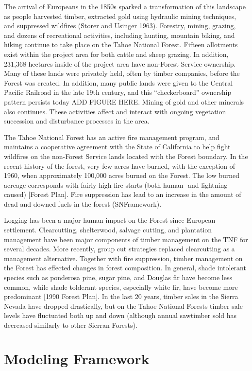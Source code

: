 The arrival of Europeans in the 1850s sparked a transformation of this landscape as people harvested timber, extracted gold using hydraulic mining techniques, and suppressed wildfires (Storer and Usinger 1963). Forestry, mining, grazing, and dozens of recreational activities, including hunting, mountain biking, and hiking continue to take place on the Tahoe National Forest. Fifteen allotments exist within the project area for both cattle and sheep grazing. In addition, 231,368 hectares inside of the project area have non-Forest Service ownership. Many of these lands were privately held, often by timber companies, before the Forest was created. In addition, many public lands were given to the Central Pacific Railroad in the late 19th century, and this ``checkerboard'' ownership pattern persists today ADD FIGURE HERE. Mining of gold and other minerals also continues. These activities affect and interact with ongoing vegetation succession and disturbance processes in the area.

The Tahoe National Forest has an active fire management program, and maintains a cooperative agreement with the State of California to help fight wildfires on the non-Forest Service lands located with the Forest boundary. In the recent history of the forest, very few acres have burned, with the exception of 1960, when approximately 100,000 acres burned on the Forest. The low burned acreage corresponds with fairly high fire starts (both human- and lightning-caused) [Forest Plan]. Fire suppression has lead to an increase in the amount of dead and downed fuels in the forest (SNFramework).

Logging has been a major human impact on the Forest since European settlement. Clearcutting, shelterwood, salvage cutting, and plantation management have been major components of timber management on the TNF for several decades. More recently, group cut strategies replaced clearcutting as a management alternative. Together with fire suppression, timber management on the Forest has effected changes in forest composition. In general, shade intolerant species such as ponderosa pine, sugar pine, and Douglas fir have become less common, while shade tolderant species, especially white fir, have become more predominant [1990 Forest Plan]. In the last 20 years, timber sales in the Sierra Nevada have dropped drastically, but on the Tahoe National Forests timber sale levels have fluctuated both up and down (although annual sawtimber sold has decreased similarly to other Sierran Forests).


\section{Modeling Framework}

